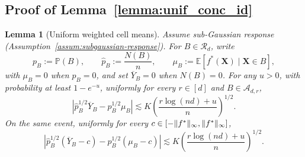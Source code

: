 \documentclass[11pt]{article}
\theoremstyle{plain}
\newtheorem{lemma}[theorem]{Lemma}
\theoremstyle{definition}
\theoremstyle{remark}
\theoremstyle{plain}
\newcommand{\bX}{\mathbf{X}}
\DeclarePairedDelimiter{\norm}{\|}{\|}
\renewcommand{\P}{\mathbb{P}}
\newcommand{\E}{\mathbb{E}}
\newcommand{\1}{\mathbbm{1}}
\begin{document}
\subsection{Proof of Lemma~\ref{lemma:unif_conc_id}}

\begin{lemma}[Uniform weighted cell means]
\label{lem:uniform-weighted-cell-means}
Assume sub-Gaussian response (Assumption~\ref{assum:subgaussian-response}).
For $B\in\mathcal R_d$, write
\[
p_B:=\P(B),\qquad \hat p_B:=\frac{N(B)}n,
\qquad
\mu_B:=\E[f^*(\bX)\mid \bX\in B],
\]
with $\mu_B=0$ when $p_B=0$, and set $\overline Y_B=0$ when
$N(B)=0$. For any $u>0$, with probability at least $1-e^{-u}$,
uniformly for every $r\in[d]$ and $B\in\mathcal A_{d,r}$,
\begin{equation}\label{eq:uniform-weighted-cell-means}
\left|\hat p_B^{1/2}\overline Y_B-p_B^{1/2}\mu_B\right|
\lesssim
K\left(\frac{r\log(nd)+u}{n}\right)^{1/2}.
\end{equation}
On the same event, uniformly for every
$c\in[-\norm{f^*}_\infty,\norm{f^*}_\infty]$,
\begin{equation}\label{eq:translated-weighted-cell-means}
\left|
\hat p_B^{1/2}(\overline Y_B-c)
-p_B^{1/2}(\mu_B-c)
\right|
\lesssim
K\left(\frac{r\log(nd)+u}{n}\right)^{1/2}.
\end{equation}
\end{lemma}
\end{document}
